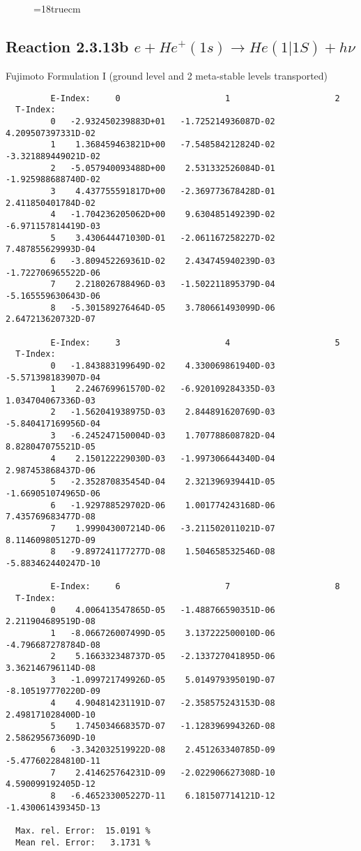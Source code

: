 \begin{figure} \label{2.3.13a}
\epsfxsize=18truecm
\end{figure}
\newpage
\subsection{
Reaction 2.3.13b  $e + He^+(1s) \rightarrow He(1|1S) + h\nu$
}

 Fujimoto Formulation I (ground level and 2 meta-stable levels transported)


\begin{verbatim}
         E-Index:     0                     1                     2
  T-Index:
         0   -2.932450239883D+01   -1.725214936087D-02    4.209507397331D-02
         1    1.368459463821D+00   -7.548584212824D-02   -3.321889449021D-02
         2   -5.057940093488D+00    2.531332526084D-01   -1.925988688740D-02
         3    4.437755591817D+00   -2.369773678428D-01    2.411850401784D-02
         4   -1.704236205062D+00    9.630485149239D-02   -6.971157814419D-03
         5    3.430644471030D-01   -2.061167258227D-02    7.487855629993D-04
         6   -3.809452269361D-02    2.434745940239D-03   -1.722706965522D-06
         7    2.218026788496D-03   -1.502211895379D-04   -5.165559630643D-06
         8   -5.301589276464D-05    3.780661493099D-06    2.647213620732D-07

         E-Index:     3                     4                     5
  T-Index:
         0   -1.843883199649D-02    4.330069861940D-03   -5.571398183907D-04
         1    2.246769961570D-02   -6.920109284335D-03    1.034704067336D-03
         2   -1.562041938975D-03    2.844891620769D-03   -5.840417169956D-04
         3   -6.245247150004D-03    1.707788608782D-04    8.828047075521D-05
         4    2.150122229030D-03   -1.997306644340D-04    2.987453868437D-06
         5   -2.352870835454D-04    2.321396939441D-05   -1.669051074965D-06
         6   -1.929788529702D-06    1.001774243168D-06    7.435769683477D-08
         7    1.999043007214D-06   -3.211502011021D-07    8.114609805127D-09
         8   -9.897241177277D-08    1.504658532546D-08   -5.883462440247D-10

         E-Index:     6                     7                     8
  T-Index:
         0    4.006413547865D-05   -1.488766590351D-06    2.211904689519D-08
         1   -8.066726007499D-05    3.137222500010D-06   -4.796687278784D-08
         2    5.166332348737D-05   -2.133727041895D-06    3.362146796114D-08
         3   -1.099721749926D-05    5.014979395019D-07   -8.105197770220D-09
         4    4.904814231191D-07   -2.358575243153D-08    2.498171028400D-10
         5    1.745034668357D-07   -1.128396994326D-08    2.586295673609D-10
         6   -3.342032519922D-08    2.451263340785D-09   -5.477602284810D-11
         7    2.414625764231D-09   -2.022906627308D-10    4.590099192405D-12
         8   -6.465233005227D-11    6.181507714121D-12   -1.430061439345D-13

  Max. rel. Error:  15.0191 %
  Mean rel. Error:   3.1731 %

\end{verbatim}
